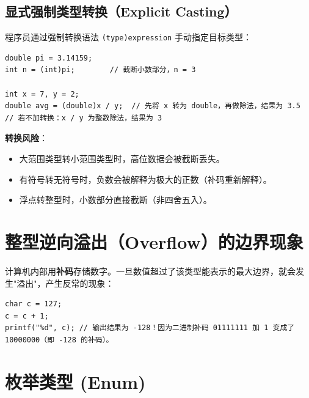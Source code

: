 \subsection{显式强制类型转换（Explicit Casting）}

程序员通过强制转换语法 \texttt{(type)expression} 手动指定目标类型：

\begin{lstlisting}[caption={显式类型转换}]
double pi = 3.14159;
int n = (int)pi;        // 截断小数部分，n = 3

int x = 7, y = 2;
double avg = (double)x / y;  // 先将 x 转为 double，再做除法，结果为 3.5
// 若不加转换：x / y 为整数除法，结果为 3
\end{lstlisting}

\textbf{转换风险}：

\begin{itemize}
    \item 大范围类型转小范围类型时，高位数据会被截断丢失。
    \item 有符号转无符号时，负数会被解释为极大的正数（补码重新解释）。
    \item 浮点转整型时，小数部分直接截断（非四舍五入）。
\end{itemize}

\section{整型逆向溢出（Overflow）的边界现象}

计算机内部用\textbf{补码}存储数字。一旦数值超过了该类型能表示的最大边界，就会发生"溢出"，产生反常的现象：

\begin{lstlisting}[caption={整型溢出示例}]
char c = 127;
c = c + 1; 
printf("%d", c); // 输出结果为 -128！因为二进制补码 01111111 加 1 变成了 10000000（即 -128 的补码）。
\end{lstlisting}

\section{枚举类型 (Enum)}

